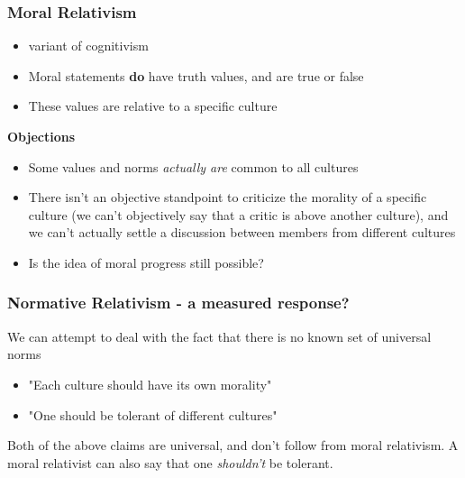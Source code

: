 \documentclass{article}
\begin{document}
    \subsubsection{Moral Relativism}
    \begin{itemize}
        \item variant of cognitivism
        \item Moral statements \textbf{do} have truth values, and are true or false
        \item These values are relative to a specific culture
    \end{itemize}
    \bigbreak \textbf{Objections}
    \begin{itemize}
        \item Some values and norms \textit{actually are} common to all cultures
        \item There isn't an objective standpoint to criticize the morality of a specific culture (we can't objectively say that a critic is above another culture), and we can't actually settle a discussion between members from different cultures
        \item Is the idea of moral progress still possible?
    \end{itemize}{}
    \subsubsection{Normative Relativism - a measured response?}
    We can attempt to deal with the fact that there is no known set of universal norms
    \begin{itemize}
        \item "Each culture should have its own morality"
        \item "One should be tolerant of different cultures"
    \end{itemize}{}
    Both of the above claims are universal, and don't follow from moral relativism. A moral relativist can also say that one \textit{shouldn't} be tolerant.
\end{document}
